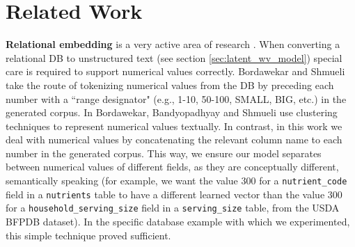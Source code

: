 \section{Related Work}\label{sec:relational_embedding}
\textbf{Relational embedding} is a very active area of research \cite{DBLP:journals/corr/abs-1803-01384, sigmod2020_keynote, pie2020_keynote}.
When converting a relational DB to unstructured text (see section \ref{sec:latent_wv_model}) special care is required to support numerical values correctly. Bordawekar and Shmueli \cite{DBLP:journals/corr/BordawekarS16} take the route of tokenizing numerical values from the DB by preceding each number with a ``range designator" (e.g., 1-10, 50-100, SMALL, BIG, etc.) in the generated corpus. In \cite{DBLP:journals/corr/abs-1712-07199} Bordawekar, Bandyopadhyay and Shmueli use clustering techniques to represent numerical values textually. In contrast, in this work we deal with numerical values by concatenating the relevant column name to each number in the generated corpus. This way, we ensure our model separates between numerical values of different fields, as they are conceptually different, semantically speaking (for example, we want the value 300 for a \texttt{nutrient\_code} field in a \texttt{nutrients} table to have a different learned vector than the value 300 for a \texttt{household\_serving\_size} field in a \texttt{serving\_size} table, from the USDA BFPDB \cite{usda_bfpd-dataset} dataset). In the specific database example with which we experimented, this simple technique proved sufficient.



